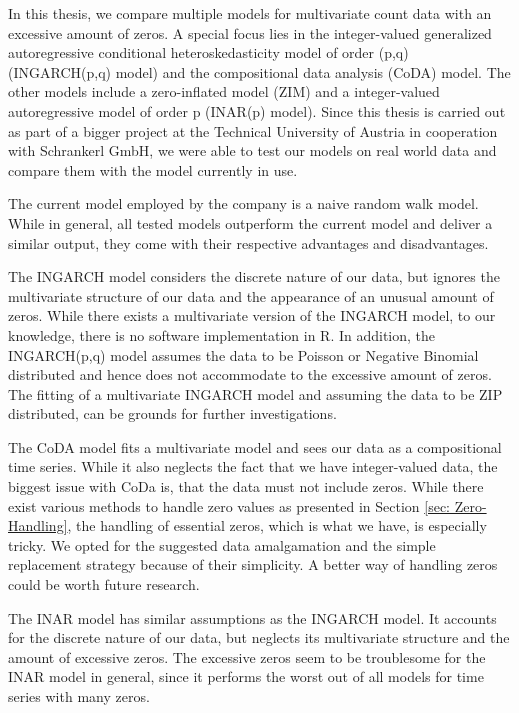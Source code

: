 In this thesis, we compare multiple models for multivariate count data with an excessive amount of zeros. A special focus lies in the integer-valued generalized autoregressive conditional heteroskedasticity model of order (p,q) (INGARCH(p,q) model) and the compositional data analysis (CoDA) model. The other models include a zero-inflated model (ZIM) and a integer-valued autoregressive model of order p (INAR(p) model). Since this thesis is carried out as part of a bigger project at the Technical University of Austria in cooperation with Schrankerl GmbH, we were able to test our models on real world data and compare them with the model currently in use. 

The current model employed by the company is a naive random walk model. While in general, all tested models outperform the current model and deliver a similar output, they come with their respective advantages and disadvantages.

The INGARCH model considers the discrete nature of our data, but ignores the multivariate structure of our data and the appearance of an unusual amount of zeros. While there exists a multivariate version of the INGARCH model, to our knowledge, there is no software implementation in R. In addition, the INGARCH(p,q) model assumes the data to be Poisson or Negative Binomial distributed and hence does not accommodate to the excessive amount of zeros. The fitting of a multivariate INGARCH model and assuming the data to be ZIP distributed, can be grounds for further investigations. 

The CoDA model fits a multivariate model and sees our data as a compositional time series. While it also neglects the fact that we have integer-valued data, the biggest issue with CoDa is, that the data must not include zeros. While there exist various methods to handle zero values as presented in Section \ref{sec: Zero-Handling}, the handling of essential zeros, which is what we have, is especially tricky. We opted for the suggested data amalgamation and the simple replacement strategy because of their simplicity. A better way of handling zeros could be worth future research. 

The INAR model has similar assumptions as the INGARCH model. It accounts for the discrete nature of our data, but neglects its multivariate structure and the amount of excessive zeros. The excessive zeros seem to be troublesome for the INAR model in general, since it performs the worst out of all models for time series with many zeros. 

